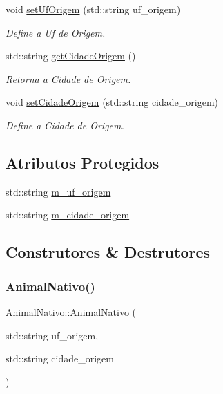 \begin{DoxyCompactItemize}
void \hyperlink{classAnimalNativo_a4d91de201fea070524bb0c7524116f0a}{set\+Uf\+Origem} (std\+::string uf\+\_\+origem)
\begin{DoxyCompactList}\small\item\em Define a Uf de Origem. \end{DoxyCompactList}\item 
std\+::string \hyperlink{classAnimalNativo_a7f4d471d82fc83b9d76d2bea01127022}{get\+Cidade\+Origem} ()
\begin{DoxyCompactList}\small\item\em Retorna a Cidade de Origem. \end{DoxyCompactList}\item 
void \hyperlink{classAnimalNativo_af28524ef3ada1b047d722e0e969d5cab}{set\+Cidade\+Origem} (std\+::string cidade\+\_\+origem)
\begin{DoxyCompactList}\small\item\em Define a Cidade de Origem. \end{DoxyCompactList}\end{DoxyCompactItemize}
\subsection*{Atributos Protegidos}
\begin{DoxyCompactItemize}
\item 
std\+::string \hyperlink{classAnimalNativo_a5ee01fe0f43cac32ad2b729e99e036b3}{m\+\_\+uf\+\_\+origem}
\item 
std\+::string \hyperlink{classAnimalNativo_a75c1303463bb16fa7c19e7467e43e1e7}{m\+\_\+cidade\+\_\+origem}
\end{DoxyCompactItemize}


\subsection{Construtores \& Destrutores}
\mbox{\label{classAnimalNativo_ad9ccd46e6a0e7129655d598548cf972b}} 
\subsubsection{\texorpdfstring{Animal\+Nativo()}{AnimalNativo()}}
{\footnotesize\ttfamily Animal\+Nativo\+::\+Animal\+Nativo (\begin{DoxyParamCaption}\item[{std\+::string}]{uf\+\_\+origem,  }\item[{std\+::string}]{cidade\+\_\+origem }\end{DoxyParamCaption})}



